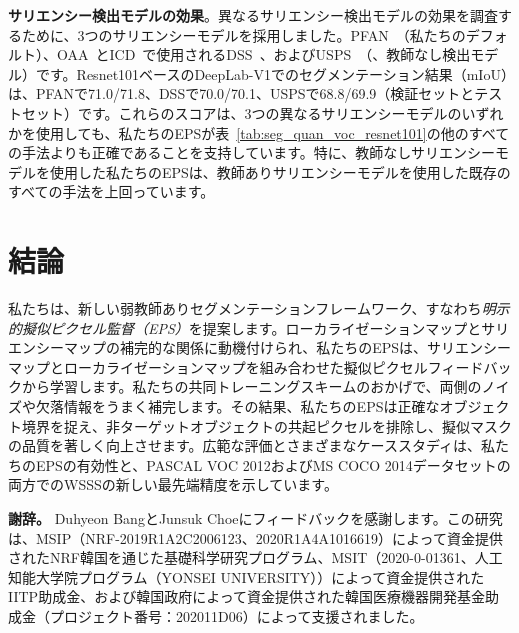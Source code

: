 \documentclass[final]{cvpr}
\begin{document}
\vspace{1mm}
\noindent \textbf{サリエンシー検出モデルの効果}。異なるサリエンシー検出モデルの効果を調査するために、3つのサリエンシーモデルを採用しました。PFAN~\cite{zhao2019pyramid}（私たちのデフォルト）、OAA~\cite{jiang2019integral}とICD~\cite{fan2020learning}で使用されるDSS~\cite{hou2017deeply}、およびUSPS~\cite{nguyen2019deepusps}（\ie、教師なし検出モデル）です。Resnet101ベースのDeepLab-V1でのセグメンテーション結果（mIoU）は、PFANで71.0/71.8、DSSで70.0/70.1、USPSで68.8/69.9（検証セットとテストセット）です。これらのスコアは、3つの異なるサリエンシーモデルのいずれかを使用しても、私たちのEPSが表~\ref{tab:seg_quan_voc_resnet101}の他のすべての手法よりも正確であることを支持しています。特に、教師なしサリエンシーモデルを使用した私たちのEPSは、教師ありサリエンシーモデルを使用した既存のすべての手法を上回っています。

\section{結論}
私たちは、新しい弱教師ありセグメンテーションフレームワーク、すなわち\emph{明示的擬似ピクセル監督（EPS）}を提案します。ローカライゼーションマップとサリエンシーマップの補完的な関係に動機付けられ、私たちのEPSは、サリエンシーマップとローカライゼーションマップを組み合わせた擬似ピクセルフィードバックから学習します。私たちの共同トレーニングスキームのおかげで、両側のノイズや欠落情報をうまく補完します。その結果、私たちのEPSは正確なオブジェクト境界を捉え、非ターゲットオブジェクトの共起ピクセルを排除し、擬似マスクの品質を著しく向上させます。広範な評価とさまざまなケーススタディは、私たちのEPSの有効性と、PASCAL VOC 2012およびMS COCO 2014データセットの両方でのWSSSの新しい最先端精度を示しています。

\noindent\textbf{謝辞。}
Duhyeon BangとJunsuk Choeにフィードバックを感謝します。この研究は、MSIP（NRF-2019R1A2C2006123、2020R1A4A1016619）によって資金提供されたNRF韓国を通じた基礎科学研究プログラム、MSIT（2020-0-01361、人工知能大学院プログラム（YONSEI UNIVERSITY））によって資金提供されたIITP助成金、および韓国政府によって資金提供された韓国医療機器開発基金助成金（プロジェクト番号：202011D06）によって支援されました。

{\small


}
\end{document}
